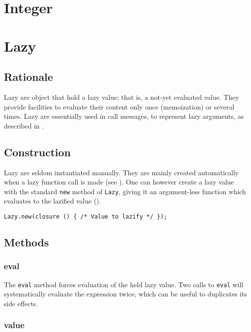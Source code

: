 \documentclass[openright,twoside,12pt]{report}
\begin{document}
\section{Integer}
\section{Lazy}

\subsection{Rationale}

Lazy are object that hold a lazy value; that is, a not-yet evaluated
value. They provide facilities to evaluate their content only once
(memoization) or several times. Lazy are essentially used in call
messages, to represent lazy arguments, as described in
.

\subsection{Construction}

Lazy are seldom instantiated manually. They are mainly created
automatically when a lazy function call is made (see
). One can however create a lazy value with the
standard \lstinline|new| method of \lstinline|Lazy|, giving it an
argument-less function which evaluates to the lazified value
().

\begin{lstlisting}[caption=Creating a lazy value, label=lst:new-lazy,
  float=\floatpos]
  Lazy.new(closure () { /* Value to lazify */ });
\end{lstlisting}

\subsection{Methods}
\subsubsection{eval}

The \lstinline|eval| method forces evaluation of the held lazy
value. Two calls to \lstinline|eval| will systematically evaluate the
expression twice, which can be useful to duplicates its side effects.

\subsubsection{value}
\end{document}
